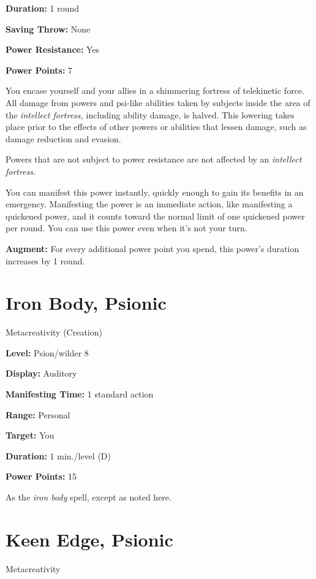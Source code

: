 \documentclass{article}
\begin{document}
\textbf{Duration:} 1 round

\textbf{Saving Throw:} None

\textbf{Power Resistance:} Yes

\textbf{Power Points:} 7

You encase yourself and your allies in a shimmering fortress of telekinetic force. 
All damage from powers and psi-like abilities taken by subjects inside the area 
of the \textit{intellect fortress, }including ability damage, is halved. This lowering 
takes place prior to the effects of other powers or abilities that lessen damage, 
such as damage reduction and evasion.

Powers that are not subject to power resistance are not affected by an \textit{intellect 
fortress.}

You can manifest this power instantly, quickly enough to gain its benefits in an 
emergency. Manifesting the power is an immediate action, like manifesting a quickened 
power, and it counts toward the normal limit of one quickened power per round. 
You can use this power even when it's not your turn.

\textbf{Augment:} For every additional power point you spend, this power's duration 
increases by 1 round.

\vspace{12pt}
\section*{Iron Body, Psionic}

Metacreativity (Creation)

\textbf{Level:} Psion/wilder 8

\textbf{Display:} Auditory

\textbf{Manifesting Time:} 1 standard action

\textbf{Range:} Personal

\textbf{Target:} You

\textbf{Duration:} 1 min./level (D)

\textbf{Power Points:} 15

As the \textit{iron body }spell, except as noted here. 

\vspace{12pt}
\section*{Keen Edge, Psionic}

Metacreativity
\end{document}
